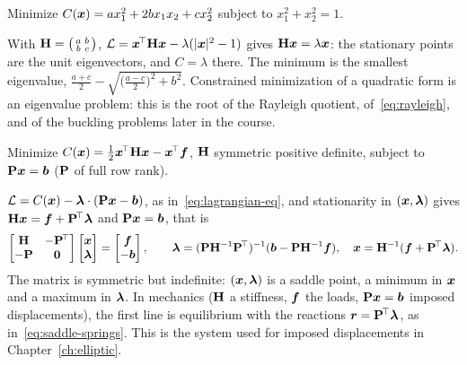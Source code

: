 \label{exo:kkt3}
%
Minimize $C(\bm{x})=ax_1^2+2bx_1x_2+cx_2^2$ subject to $x_1^2+x_2^2=1$.
\begin{solution}
With $\mathbf{H}=\begin{psmallmatrix}a&b\\b&c\end{psmallmatrix}$,
$\mathcal L=\bm{x}^{\!\top}\mathbf{H}\bm{x}-\lambda(|\bm{x}|^2-1)$ gives $\mathbf{H}\bm{x}=\lambda\bm{x}$:
the stationary points are the unit eigenvectors, and $C=\lambda$ there. The
minimum is the smallest eigenvalue,
$\tfrac{a+c}2-\sqrt{\bigl(\tfrac{a-c}2\bigr)^2+b^2}$. Constrained minimization
of a quadratic form is an eigenvalue problem: this is the root of the
Rayleigh quotient, of~\eqref{eq:rayleigh}, and of the buckling problems later
in the course.
\end{solution}

\label{exo:kkt4}
%
Minimize $C(\bm{x})=\tfrac12\bm{x}^{\!\top}\mathbf{H}\bm{x}-\bm{x}^{\!\top}\bm{f}$, $\mathbf{H}$ symmetric
positive definite, subject to $\mathbf{P}\bm{x}=\bm{b}$ ($\mathbf{P}$ of full row rank).
\begin{solution}
$\mathcal L=C(\bm{x})-\bm{\lambda}\cdot(\mathbf{P}\bm{x}-\bm{b})$, as
in~\eqref{eq:lagrangian-eq}, and stationarity in $(\bm{x},\bm{\lambda})$ gives
$\mathbf{H}\bm{x}=\bm{f}+\mathbf{P}^{\!\top}\bm{\lambda}$ and $\mathbf{P}\bm{x}=\bm{b}$, that is
\[
  \begin{bmatrix}\mathbf{H}&-\mathbf{P}^{\!\top}\\ -\mathbf{P}&\mathbf{0}\end{bmatrix}
  \begin{bmatrix}\bm{x}\\ \bm{\lambda}\end{bmatrix}=
  \begin{bmatrix}\bm{f}\\ -\bm{b}\end{bmatrix},
  \qquad
  \bm{\lambda}=(\mathbf{P}\mathbf{H}^{-1}\mathbf{P}^{\!\top})^{-1}(\bm{b}-\mathbf{P}\mathbf{H}^{-1}\bm{f}),\quad
  \bm{x}=\mathbf{H}^{-1}(\bm{f}+\mathbf{P}^{\!\top}\bm{\lambda}).
\]
The matrix is symmetric but indefinite: $(\bm{x},\bm{\lambda})$ is a saddle point,
a minimum in $\bm{x}$ and a maximum in $\bm{\lambda}$. In mechanics ($\mathbf{H}$ a
stiffness, $\bm{f}$ the loads, $\mathbf{P}\bm{x}=\bm{b}$ imposed displacements), the
first line is equilibrium with the reactions $\bm{r}=\mathbf{P}^{\!\top}\bm{\lambda}$, as
in~\eqref{eq:saddle-springs}. This is the system used for imposed
displacements in Chapter~\ref{ch:elliptic}.
\end{solution}

